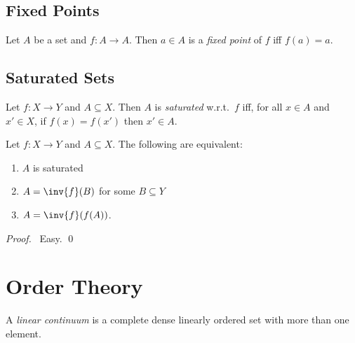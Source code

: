 \section{Fixed Points}

\begin{df}
  Let $A$ be a set and $f : A \rightarrow A$. Then $a \in A$ is a \emph{fixed point} of $f$ iff $f(a) = a$.
\end{df}

\section{Saturated Sets}

\begin{df}
  Let $f : X \rightarrow Y$ and $A \subseteq X$. Then $A$ is \emph{saturated} w.r.t.~$f$ iff, for all $x \in A$ and $x' \in X$, if $f(x) = f(x')$ then $x' \in A$.
\end{df}

\begin{prop}
  Let $f : X \rightarrow Y$ and $A \subseteq X$. The following are equivalent:
  \begin{enumerate}
    \item $A$ is saturated
    \item $A = \inv{f}(B)$ for some $B \subseteq Y$
    \item $A = \inv{f}(f(A))$.
  \end{enumerate}
\end{prop}

\begin{proof}
  \pf\ Easy. \qed
\end{proof}

\chapter{Order Theory}

\begin{df}
  A \emph{linear continuum} is a complete dense linearly ordered set with more than one element.
\end{df}
